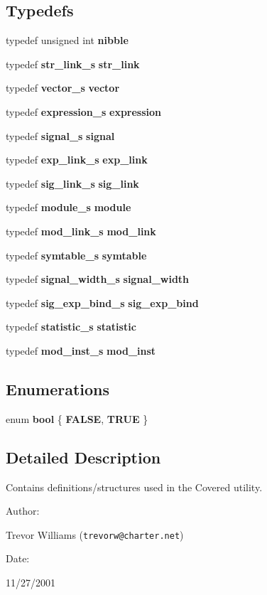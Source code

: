 \subsection*{Typedefs}
\begin{CompactItemize}
\item 
typedef unsigned int {\bf nibble}
\item 
typedef {\bf str\_\-link\_\-s} {\bf str\_\-link}
\item 
typedef {\bf vector\_\-s} {\bf vector}
\item 
typedef {\bf expression\_\-s} {\bf expression}
\item 
typedef {\bf signal\_\-s} {\bf signal}
\item 
typedef {\bf exp\_\-link\_\-s} {\bf exp\_\-link}
\item 
typedef {\bf sig\_\-link\_\-s} {\bf sig\_\-link}
\item 
typedef {\bf module\_\-s} {\bf module}
\item 
typedef {\bf mod\_\-link\_\-s} {\bf mod\_\-link}
\item 
typedef {\bf symtable\_\-s} {\bf symtable}
\item 
typedef {\bf signal\_\-width\_\-s} {\bf signal\_\-width}
\item 
typedef {\bf sig\_\-exp\_\-bind\_\-s} {\bf sig\_\-exp\_\-bind}
\item 
typedef {\bf statistic\_\-s} {\bf statistic}
\item 
typedef {\bf mod\_\-inst\_\-s} {\bf mod\_\-inst}
\end{CompactItemize}
\subsection*{Enumerations}
\begin{CompactItemize}
\item 
enum {\bf bool} \{ {\bf FALSE}, 
{\bf TRUE}
 \}
\end{CompactItemize}


\subsection{Detailed Description}
Contains definitions/structures used in the Covered utility.



\begin{Desc}
\item[Author: ]\par
Trevor Williams ({\tt trevorw@charter.net}) \end{Desc}
\begin{Desc}
\item[Date: ]\par
11/27/2001\end{Desc}


